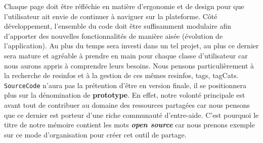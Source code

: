 Chaque page doit être réfléchie en matière d'ergonomie et de design pour que l'utilisateur ait envie de continuer à naviguer sur la plateforme. Côté développement, l'ensemble du code doit être suffisamment modulaire afin d'apporter des nouvelles fonctionnalités de manière aisée (évolution de l'application). Au plus du temps sera investi dans un tel projet, au plus ce dernier sera mature et agréable à prendre en main pour chaque classe d'utilisateur car nous aurons appris à comprendre leurs besoins. Nous pensons particulièrement à la recherche de \glspl{resinfo} et à la gestion de ces mêmes \glspl{resinfo}, \glspl{tag}, \glspl{tagCat}.\\

\texttt{SourceCode} n'aura pas la prétention d'être en version finale, il se positionnera plus sur la dénomination de \textbf{prototype}. En effet, notre volonté principale est avant tout de contribuer au domaine des ressources partagées car nous pensons que ce dernier est porteur d'une riche communauté d'entre-aide. C'est pourquoi le titre de notre mémoire contient les mots \textbf{\textit{open source}} car nous prenons exemple sur ce mode d'organisation pour créer cet outil de partage.

